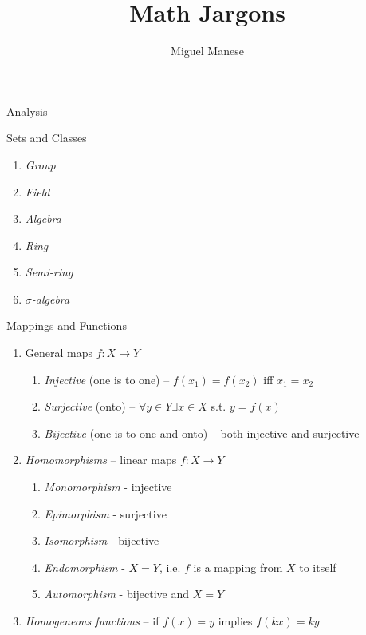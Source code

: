 \documentclass{article}
\title{Math Jargons}
\author{Miguel Manese}
\begin{document}
\maketitle

\begin{section}{Analysis}
\begin{subsection}{Sets and Classes}
\begin{enumerate}
\item \emph{Group}
\item \emph{Field}
\item \emph{Algebra}
\item \emph{Ring}
\item \emph{Semi-ring}
\item \emph{$\sigma$-algebra}
\end{enumerate}

\end{subsection}

\begin{subsection}{Mappings and Functions}
\begin{enumerate}
\item General maps $f : X \to Y$
  \begin{enumerate}
  \item \emph{Injective} (one is to one) -- $f(x_1) = f(x_2)$ iff $x_1 = x_2$
  \item \emph{Surjective} (onto) -- $\forall y \in Y \exists x \in X$ s.t. 
        $y = f(x)$
  \item \emph{Bijective} (one is to one and onto) -- both injective and 
        surjective
  \end{enumerate}
\item \emph{Homomorphisms} -- linear maps $f : X \to Y$
  \begin{enumerate}
  \item \emph{Monomorphism} - injective
  \item \emph{Epimorphism} - surjective
  \item \emph{Isomorphism} - bijective
  \item \emph{Endomorphism} - $X = Y$, i.e. $f$ is a mapping from $X$ to itself
  \item \emph{Automorphism} - bijective and $X = Y$
  \end{enumerate}
\item \emph{Homogeneous functions} -- if $f(x) = y$ implies $f(kx) = ky$
\end{enumerate}
\end{subsection}

\end{section}
\end{document}

